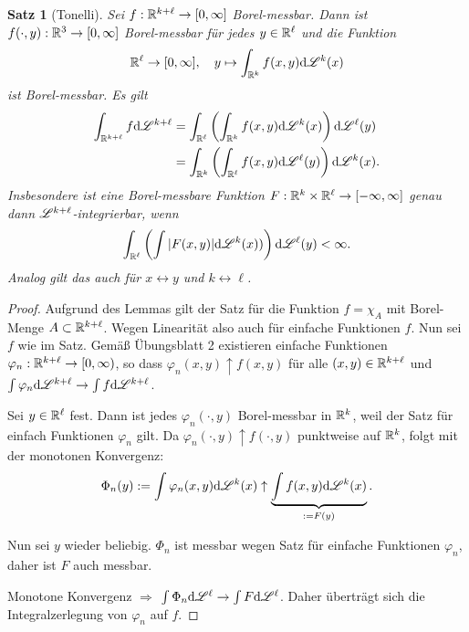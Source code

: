 \documentclass[
 a4paper,
 12pt,
 parskip=half
 ]{scrartcl}
\theoremstyle{plain}
\newtheorem*{thm*}{Satz}
\theoremstyle{definition}
\numberwithin{equation}{section}
\begin{document}
\begin{thm*}[Tonelli]
 Sei $f: \mathbb{R}^{k+\ell} \to [0, \infty]$ Borel-messbar. Dann ist $f(\cdot,y):\mathbb{R}^3 \to [0,\infty]$ Borel-messbar für jedes $y \in \mathbb{R}^\ell$ und die Funktion
 \[ \mathbb{R}^\ell \to [0,\infty], \quad y \mapsto \int_{\mathbb{R}^k} f(x,y) \mathrm{d} \mathscr{L}^k (x) \]
 ist Borel-messbar. Es gilt
 \[ \begin{aligned} \int_{\mathbb{R}^{k+\ell}} f \mathrm{d} \mathscr{L}^{k+\ell} 
    &= \int_{\mathbb{R}^\ell} \left( \int_{\mathbb{R}^k} f(x,y) \mathrm{d} \mathscr{L}^k (x) \right) \mathrm{d} \mathscr{L}^\ell (y) \\
    &= \int_{\mathbb{R}^k} \left( \int_{\mathbb{R}^\ell} f(x,y) \mathrm{d} \mathscr{L}^\ell (y) \right) \mathrm{d} \mathscr{L}^k (x).
 \end{aligned} \]
 Insbesondere ist eine Borel-messbare Funktion $F: \mathbb{R}^k \times \mathbb{R}^\ell \to [-\infty, \infty]$ genau dann $\mathscr{L}^{k+\ell}$-integrierbar, wenn
 \[ \int_{\mathbb{R}^\ell} \left( \int |F(x,y)| \mathrm{d} \mathscr{L}^k (x) ) \right) \mathrm{d} \mathscr{L}^\ell (y) < \infty. \]
 Analog gilt das auch für $x \leftrightarrow y$ und $k \leftrightarrow \ell$.
\end{thm*}

\begin{proof}
 Aufgrund des Lemmas gilt der Satz für die Funktion $f = \chi_A$ mit Borel-Menge $A \subset \mathbb{R}^{k+\ell}$. Wegen Linearität also auch für einfache Funktionen $f$. Nun sei $f$ wie im Satz. Gemäß Übungsblatt 2 existieren einfache Funktionen $\varphi_n : \mathbb{R}^{k+\ell} \to [0, \infty)$, so dass $\varphi_n (x,y) \uparrow f(x,y)$ für alle $(x,y) \in \mathbb{R}^{k+\ell}$ und $\int \varphi_n \mathrm{d} \mathscr{L}^{k+\ell} \rightarrow \int f \mathrm{d} \mathscr{L}^{k+\ell}$.
 
 Sei $y \in \mathbb{R}^\ell$ fest. Dann ist jedes $\varphi_n(\cdot, y)$ Borel-messbar in $\mathbb{R}^k$, weil der Satz für einfach Funktionen $\varphi_n$ gilt. Da $\varphi_n(\cdot, y) \uparrow f( \cdot, y)$ punktweise auf $\mathbb{R}^k$, folgt mit der monotonen Konvergenz:
 \[ \Phi_n(y) := \int \varphi_n(x,y) \mathrm{d} \mathscr{L}^k (x) \uparrow \underbrace{\int f(x,y) \mathrm{d} \mathscr{L}^k (x)}_{:= F(y)}. \]
 
 Nun sei $y$ wieder beliebig. $\Phi_n$ ist messbar wegen Satz für einfache Funktionen $\varphi_n$, daher ist $F$ auch messbar.
 
 Monotone Konvergenz $\Rightarrow$ $\int \Phi_n \mathrm{d} \mathscr{L}^\ell \rightarrow \int F \mathrm{d} \mathscr{L}^\ell$. Daher überträgt sich die Integralzerlegung von $\varphi_n$ auf $f$.
\end{proof}
\end{document}
